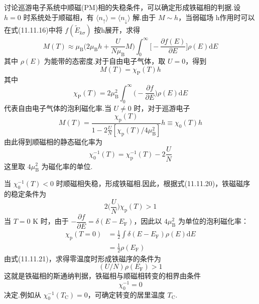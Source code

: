 讨论巡游电子系统中顺磁(PM)相的失稳条件，可以确定形成铁磁相的判据.设 $h=0$ 时系统处于顺磁相，有 $\langle n_{\uparrow}\rangle=\langle n_{\downarrow}\rangle$ 解.由于 $M\sim h$，当弱磁场 h作用时可以在式(11.11.16)中将 $f(\widetilde{E}_{k\sigma})$ 按h展开，求得
\begin{equation}
  M(T)\approx\mu_{\mathrm{B}}\biggl(2\mu_{\mathrm{B}}h+\frac{U}{N\mu_{\mathrm{B}}}M\biggr)
  \int_{0}^{\infty}\biggl[-\frac{\partial f(E)}{\partial E}\biggr]\rho(E)\mathrm{d}E
\end{equation}
其中 $\rho(E)$ 为能带的态密度.对于自由电子气体，取 $U=0$，得到
\begin{equation*}
  M(T)=\chi_{\mathrm{P}}(T)h
\end{equation*}
其中
\begin{equation}
  \chi_{\mathrm{P}}(T)=2\mu_{\mathrm{B}}^{2}\int_{0}^{\infty}
  \biggl(-\frac{\partial f}{\partial E}\biggr)\rho(E)\mathrm{d}E
\end{equation}
代表自由电子气体的泡利磁化率.当 $U\neq 0$ 时，对于巡游电子
\begin{equation}
  M(T)=\frac{\chi_{\mathrm{p}}(T)}{1-2\frac{U}{N}[\chi_{\mathrm{p}}(T)/4\mu_{\mathrm{B}}^{2}]}h
  \equiv\chi_{0}(T)h
\end{equation}
由此得到顺磁相的静态磁化率为
\begin{equation}
  \chi_{0}^{-1}(T)=\chi_{\mathrm{p}}^{-1}(T)-2\frac{U}{N}
\end{equation}
这里取 $4\mu_{\mathrm{B}}^{2}$ 为磁化率的单位.

当 $\chi_{0}^{-1}(T)<0$ 时顺磁相失稳，形成铁磁相.因此，根据式(11.11.20)，铁磁磁序的稳定条件为
\begin{equation}
  2\biggl(\frac{U}{N}\biggr)\chi_{\mathrm{p}}(T)>1
\end{equation}
当 $T=0$ K 时，由于 $-\dfrac{\partial f}{\partial E}=\delta(E-E_{\mathrm{F}})$，因此以 $4\mu_{\mathrm{B}}^{2}$ 为单位的泡利磁化率：
\begin{equation*}
\begin{aligned}
  \chi_{\mathrm{p}}(T=0)&=\frac{1}{2}\int\delta(E-E_{\mathrm{F}})\rho(E)\mathrm{d}E\\
  &=\frac{1}{2}\rho(E_{\mathrm{F}})
\end{aligned}
\end{equation*}
由式(11.11.21)，求得零温度时形成铁磁序的条件为
\begin{equation}
  (U/N)\rho(E_{\mathrm{F}})>1
\end{equation}
这就是铁磁相的斯通纳判据，铁磁相与顺磁相转变的相界由条件
\begin{equation}
  \chi_{0}^{-1}=0
\end{equation}
决定.例如从 $\chi_{0}^{-1}(T_{\mathrm{C}})=0$，可确定转变的居里温度 $T_{\mathrm{C}}$.

